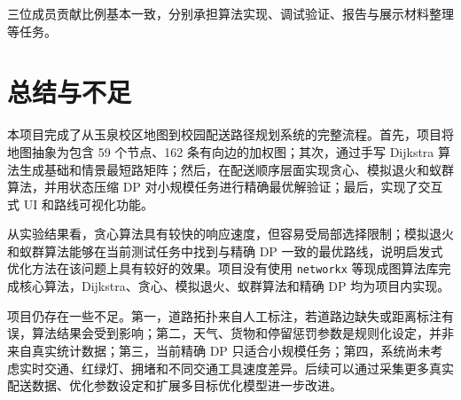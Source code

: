 \documentclass[12pt,a4paper,UTF8]{article}
\begin{document}
三位成员贡献比例基本一致，分别承担算法实现、调试验证、报告与展示材料整理等任务。

\section{总结与不足}

本项目完成了从玉泉校区地图到校园配送路径规划系统的完整流程。首先，项目将地图抽象为包含 59 个节点、162 条有向边的加权图；其次，通过手写 Dijkstra 算法生成基础和情景最短路矩阵；然后，在配送顺序层面实现贪心、模拟退火和蚁群算法，并用状态压缩 DP 对小规模任务进行精确最优解验证；最后，实现了交互式 UI 和路线可视化功能。

从实验结果看，贪心算法具有较快的响应速度，但容易受局部选择限制；模拟退火和蚁群算法能够在当前测试任务中找到与精确 DP 一致的最优路线，说明启发式优化方法在该问题上具有较好的效果。项目没有使用 \texttt{networkx} 等现成图算法库完成核心算法，Dijkstra、贪心、模拟退火、蚁群算法和精确 DP 均为项目内实现。

项目仍存在一些不足。第一，道路拓扑来自人工标注，若道路边缺失或距离标注有误，算法结果会受到影响；第二，天气、货物和停留惩罚参数是规则化设定，并非来自真实统计数据；第三，当前精确 DP 只适合小规模任务；第四，系统尚未考虑实时交通、红绿灯、拥堵和不同交通工具速度差异。后续可以通过采集更多真实配送数据、优化参数设定和扩展多目标优化模型进一步改进。
\end{document}
